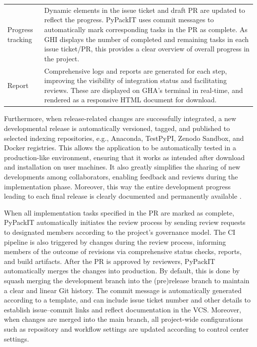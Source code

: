 \documentclass{article}
\begin{document}
\begin{table}[h!]
\begin{tabularx}{\textwidth}{p{} X}
Progress tracking & Dynamic elements in the issue ticket and draft PR are updated to reflect the progress. PyPackIT uses commit messages to automatically mark corresponding tasks in the PR as complete. As GHI displays the number of completed and remaining tasks in each issue ticket/PR, this provides a clear overview of overall progress in the project.\\

Report & Comprehensive logs and reports are generated for each step, improving the visibility of integration status and facilitating reviews. These are displayed on GHA's terminal in real-time, and rendered as a responsive HTML document for download.\\

\bottomrule
\end{tabularx}
\end{table}

Furthermore, when release-related changes are successfully integrated, a new developmental release is automatically versioned, tagged, and published to selected indexing repositories, e.g., Anaconda, TestPyPI, Zenodo Sandbox, and Docker registries. This allows the application to be automatically tested in a production-like environment, ensuring that it works as intended after download and installation on user machines. It also greatly simplifies the sharing of new developments among collaborators, enabling feedback and reviews during the implementation phase. Moreover, this way the entire development progress leading to each final release is clearly documented and permanently available \cite{CICDSystematicReview}.

When all implementation tasks specified in the PR are marked as complete, PyPackIT automatically initiates the review process by sending review requests to designated members according to the project's governance model. The CI pipeline is also triggered by changes during the review process, informing members of the outcome of revisions via comprehensive status checks, reports, and build artifacts. After the PR is approved by reviewers, PyPackIT automatically merges the changes into production. By default, this is done by squash merging the development branch into the (pre)release branch to maintain a clear and linear Git history. The commit message is automatically generated according to a template, and can include issue ticket number and other details to establish issue–commit links and reflect documentation in the VCS. Moreover, when changes are merged into the main branch, all project-wide configurations such as repository and workflow settings are updated according to control center settings.
\end{document}
